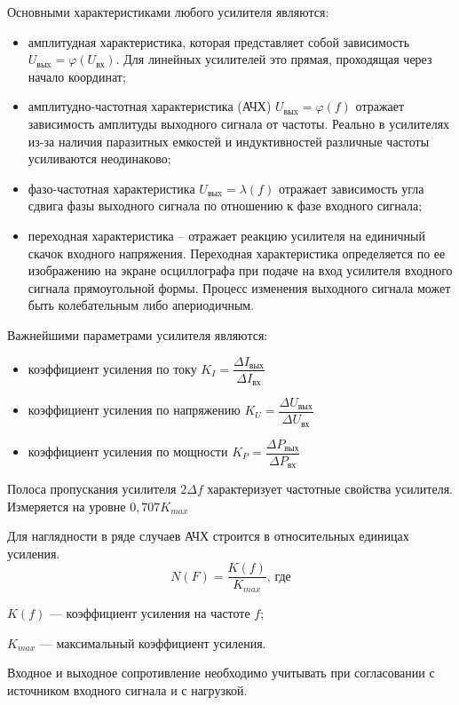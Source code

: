 \documentclass[unicode, 12pt, a4paper, oneside]{article}
\begin{document}
Основными характеристиками любого усилителя являются:
\begin{itemize}
\item амплитудная характеристика, которая представляет собой зависимость $U_\text{выx} = \varphi(U_\text{вх})$. Для линейных усилителей это прямая, проходящая через начало координат;
\item амплитудно-частотная характеристика (АЧХ) $U_\text{выx} = \varphi(f)$ отражает зависимость амплитуды выходного сигнала от частоты. Реально в усилителях из-за наличия паразитных емкостей и индуктивностей различные частоты усиливаются неодинаково;
\item фазо-частотная характеристика $U_\text{выx} = \lambda(f)$ отражает зависимость угла сдвига фазы выходного сигнала по отношению к фазе входного сигнала;
\item переходная характеристика – отражает реакцию усилителя на единичный скачок входного напряжения. Переходная характеристика определяется по ее изображению на экране осциллографа при подаче на вход усилителя входного сигнала прямоугольной формы. Процесс изменения выходного сигнала может быть колебательным либо апериодичным.
\end{itemize}

Важнейшими параметрами усилителя являются:
\begin{itemize}
\item коэффициент усиления по току $K_{I} = \dfrac{\Delta I_\text{вых}}{\Delta I_\text{вх}}$
\item коэффициент усиления по напряжению $K_{U} = \dfrac{\Delta U_\text{вых}}{\Delta U_\text{вх}}$
\item коэффициент усиления по мощности $K_{P} = \dfrac{\Delta P_\text{вых}}{\Delta P_\text{вх}}$
\end{itemize}

Полоса пропускания усилителя $2\Delta f$ характеризует частотные свойства усилителя. Измеряется на уровне $0,707 K_{max}$

Для наглядности в ряде случаев АЧХ строится в относительных единицах усиления.
\begin{equation}
N(F) = \dfrac{K(f)}{K_{max}}\text{, где}
\end{equation}
\par $K(f)$ --- коэффициент усиления на частоте $f$;
\par $K_{max}$ --- максимальный коэффициент усиления.

Входное и выходное сопротивление необходимо учитывать при согласовании с источником входного сигнала и с нагрузкой. 
\end{document}
